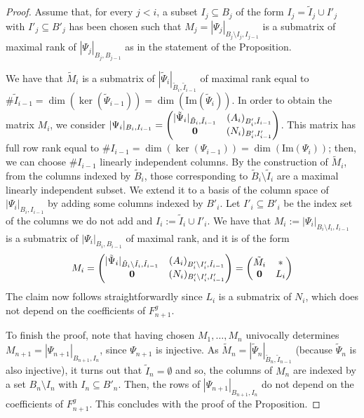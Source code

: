 \documentclass[a4paper,11pt]{amsart}
\numberwithin{thm}{section}
\numberwithin{equation}{section}
\theoremstyle{definition}
\theoremstyle{plain}
\begin{document}
\begin{proof}
Assume that, for every $j<i$, a subset $I_{j}\subseteq B_j$ of the form  $I_{j}=\tilde{I}_{j} \cup I'_{j}$ with  $I'_{j}\subseteq B'_{j}$ has been chosen such that
$M_j= |\Psi_j|_{B_j\setminus I_j, I_{j-1}}$ is a submatrix of maximal rank of $|\Psi_j|_{B_j, B_{j-1}}$ as in the statement of the Proposition.


We have that $\tilde{M}_i$ is a submatrix of $|\tilde{\Psi}_{i}|_{ \tilde{B}_i, \tilde{I}_{i-1}}$ of maximal rank equal to $\#\tilde{I}_{i-1} = \dim(\ker(\tilde{\Psi}_{i-1})) = \dim(\mbox{Im}(\tilde{\Psi}_i))$.
In order to obtain the matrix $M_i$, we consider $|\Psi_i|_{B_i, I_{i-1}}=\begin{pmatrix}
 |\tilde{\Psi}_{i}|_{ \tilde{B}_i, \tilde{I}_{i-1}}& (A_i)_{B'_i,\tilde{I}_{i-1}}\\
 {\bf 0}& (N_i)_{B'_{i},I'_{i-1}}\end{pmatrix}$.
This matrix has full row rank equal to $\#I_{i-1}=\dim(\ker(\Psi_{i-1}))= \dim(\mbox{Im}(\Psi_i))$; then, we can choose $\#I_{i-1}$ linearly independent columns. By the construction of $\tilde{M}_i$, from the columns indexed by $\tilde{B}_i$, those corresponding to $\tilde{B}_i\setminus \tilde{I}_i$ are a maximal linearly independent subset. We extend it to a basis of the column space of $|\Psi_i|_{B_i, I_{i-1}}$  by adding some columns indexed by $B'_i$. Let $I'_i\subseteq B'_i$ be the index set of the columns we do not add and $I_i:= \tilde{I}_i \cup I'_i$. We have that $M_i:=|\Psi_{i}|_{ B_i\setminus I_i, I_{i-1}}$ is a submatrix of $|\Psi_i|_{B_i, B_{i-1}}$ of maximal rank, and it is of the form
$$M_i = \begin{pmatrix}
 |\tilde{\Psi}_{i}|_{ \tilde{B}_i\setminus \tilde{I}_i, \tilde{I}_{i-1}}& (A_i)_{B'_i\setminus I'_i,\tilde{I}_{i-1}}\\
 {\bf 0}& (N_i)_{B'_{i}\setminus I'_i,I'_{i-1}}\end{pmatrix} = \begin{pmatrix}
\tilde{M}_{i} &*\\
 {\bf 0}& L_i\end{pmatrix}$$
The claim now follows straightforwardly since $L_i$ is a submatrix of $N_i$, which does not depend on the coefficients of $F_{n+1}^g$.

To finish the proof, note that having chosen $M_1,\ldots, M_n$ univocally determines $M_{n+1}=|\Psi_{n+1}|_{B_{n+1}, I_{n}}$, since $\Psi_{n+1}$ is injective. As $\tilde{M}_n = |\tilde{\Psi}_n|_{\tilde{B}_n, \tilde{I}_{n-1}}$ (because $\tilde{\Psi}_n$ is also injective),  it turns out that $\tilde{I}_n = \emptyset$ and so, the columns of $M_n$ are indexed by a set $B_n\setminus I_n$ with
$I_n\subseteq B'_n$. Then, the rows of $|\Psi_{n+1}|_{B_{n+1}, I_{n}}$ do not depend on the coefficients of $F_{n+1}^g$. This concludes with the proof of the Proposition.
\end{proof}
\end{document}
